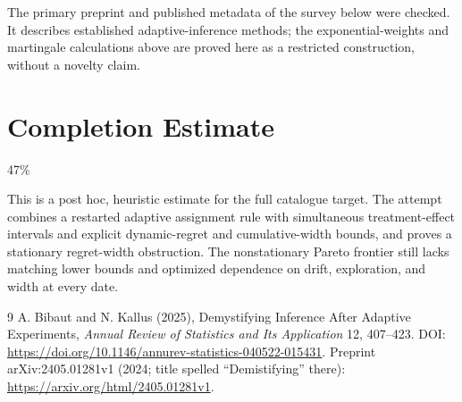 \documentclass[11pt]{article}
\theoremstyle{remark}\newtheorem{remark}[theorem]{Remark}
\begin{document}
The primary preprint and published metadata of the survey below were checked. It describes established adaptive-inference methods; the exponential-weights and martingale calculations above are proved here as a restricted construction, without a novelty claim.

\section{Completion Estimate}
47\%

This is a post hoc, heuristic estimate for the full catalogue target.
The attempt combines a restarted adaptive assignment rule with simultaneous treatment-effect intervals and explicit dynamic-regret and cumulative-width bounds, and proves a stationary regret-width obstruction. The nonstationary Pareto frontier still lacks matching lower bounds and optimized dependence on drift, exploration, and width at every date.

\begin{thebibliography}{9}
 A. Bibaut and N. Kallus (2025), Demystifying Inference After Adaptive Experiments, \emph{Annual Review of Statistics and Its Application} 12, 407--423. DOI: \url{https://doi.org/10.1146/annurev-statistics-040522-015431}. Preprint arXiv:2405.01281v1 (2024; title spelled ``Demistifying'' there): \url{https://arxiv.org/html/2405.01281v1}.
\end{thebibliography}
\end{document}
